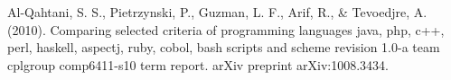 \documentclass[twoside,twocolumn]{article}
\begin{document}
\begin{thebibliography}{99} %

 
\newblock Al-Qahtani, S. S., Pietrzynski, P., Guzman, L. F., Arif, R., & Tevoedjre, A. (2010). Comparing selected criteria of programming languages java, php, c++, perl, haskell, aspectj, ruby, cobol, bash scripts and scheme revision 1.0-a team cplgroup comp6411-s10 term report. arXiv preprint arXiv:1008.3434.
\end{thebibliography}

\end{document}
